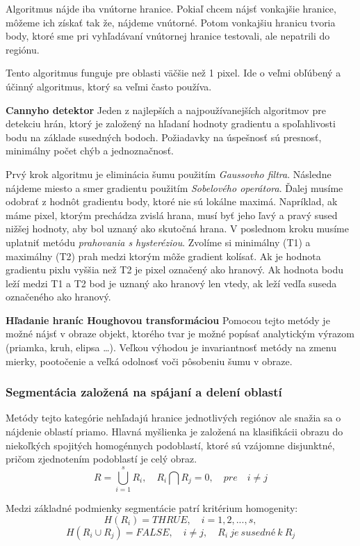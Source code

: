 Algoritmus nájde iba vnútorne hranice. Pokiaľ chcem nájsť vonkajšie hranice, môžeme ich získať tak že, nájdeme vnútorné. Potom vonkajšiu hranicu tvoria body, ktoré sme pri vyhľadávaní vnútornej hranice testovali, ale nepatrili do regiónu. 

Tento algoritmus funguje pre oblasti väčšie než 1 pixel.  Ide o veľmi obľúbený a účinný algoritmus, ktorý sa veľmi často používa.

\textbf{Cannyho detektor}
Jeden z najlepších a najpoužívanejších algoritmov pre detekciu hrán, ktorý je založený na hľadaní hodnoty gradientu a spoľahlivosti bodu na základe susedných bodoch. Požiadavky na úspešnosť sú presnosť, minimálny počet chýb a jednoznačnosť. 

Prvý krok algoritmu je eliminácia šumu použitím \textit{Gaussovho filtra}.  Následne nájdeme miesto a smer gradientu použitím \textit{Sobelového operátora}. Ďalej musíme odobrať z hodnôt gradientu  body, ktoré nie sú lokálne maximá. Napríklad, ak máme pixel, ktorým prechádza zvislá hrana, musí byť jeho ľavý a pravý sused nižšej hodnoty, aby bol uznaný  ako skutočná hrana. V poslednom kroku musíme uplatniť metódu \textit{prahovania s hysteréziou}. Zvolíme si minimálny (T1) a maximálny (T2) prah medzi ktorým môže gradient kolísať.  Ak je hodnota gradientu pixlu vyššia než T2 je pixel označený ako hranový. Ak hodnota bodu leží medzi T1 a T2 bod je uznaný ako hranový len vtedy, ak leží vedľa suseda označeného ako hranový.


\textbf{Hľadanie hraníc Houghovou transformáciou}
Pomocou tejto metódy je možné nájsť v obraze objekt, ktorého tvar je možné popísať analytickým výrazom (priamka, kruh, elipsa …). Veľkou výhodou je invariantnosť metódy na zmenu mierky, pootočenie a veľká odolnosť voči pôsobeniu šumu v obraze. 

\subsubsection{Segmentácia založená na spájaní a delení oblastí}
Metódy tejto kategórie nehľadajú hranice jednotlivých regiónov ale snažia sa o nájdenie oblastí priamo. Hlavná myšlienka je založená na klasifikácii obrazu do niekoľkých spojitých homogénnych podoblastí, ktoré sú vzájomne disjunktné, pričom zjednotením podoblastí je celý obraz.
$$R=\bigcup_{i=1}^s R_i{,}\quad R_i\bigcap R_j=0{,}\quad{pre}\quad i\neq j$$

Medzi základné podmienky segmentácie patrí kritérium homogenity:
$$H(R_i)={THRUE}{,}\quad \textit{i}=1{,}2{,}{...}{,}s{,}$$
$$H(R_i \cup R_j)={FALSE}{,}\quad \textit{i} \neq \textit{j}{,}\quad R_i { \ je \ susedné \ k \ } R_j $$

